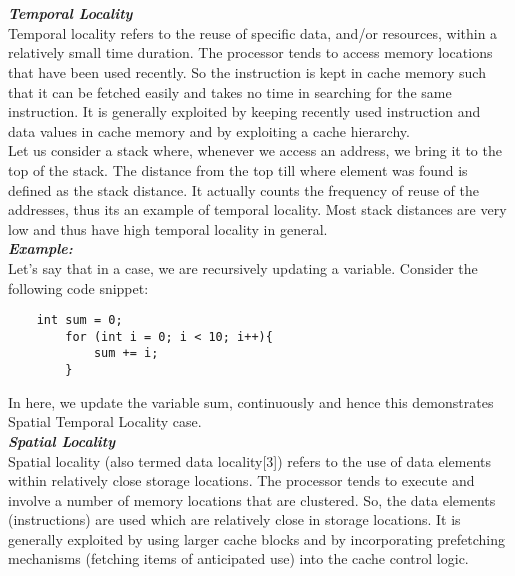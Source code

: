 \documentclass[12pt]{article}
\begin{document}
\maketitle

\section{}

\textbf{\textit{Temporal Locality}} \\
Temporal locality refers to the reuse of specific data, and/or resources, within a relatively small time duration. The processor tends to access memory locations that have been used recently. So the instruction is kept in cache memory such that it can be fetched easily and takes no time in searching for the same instruction. It is generally exploited by keeping recently used instruction and data values in cache memory and by exploiting a cache hierarchy. \\

Let us consider a stack where, whenever we access an address, we bring it to the top of the stack. The distance from the top till where element was found is defined as the stack distance. It actually counts the frequency of reuse of the addresses, thus its an example of temporal locality. Most stack distances are very low and thus have high temporal locality in general. \\

\textbf{\textit{Example:}} \\ 
Let's say that in a case, we are recursively updating a variable. Consider the following code snippet:
\begin{verbatim}
    int sum = 0;
        for (int i = 0; i < 10; i++){
            sum += i;
        }
\end{verbatim}
In here, we update the variable sum, continuously and hence this demonstrates Spatial Temporal Locality case. \\

\textbf{\textit{Spatial Locality}} \\ 
Spatial locality (also termed data locality[3]) refers to the use of data elements within relatively close storage locations. The processor tends to execute and involve a number of memory locations that are clustered. So, the data elements (instructions) are used which are relatively close in storage locations. It is generally exploited by using larger cache blocks and by incorporating prefetching mechanisms (fetching items of anticipated use) into the cache control logic.
\end{document}
